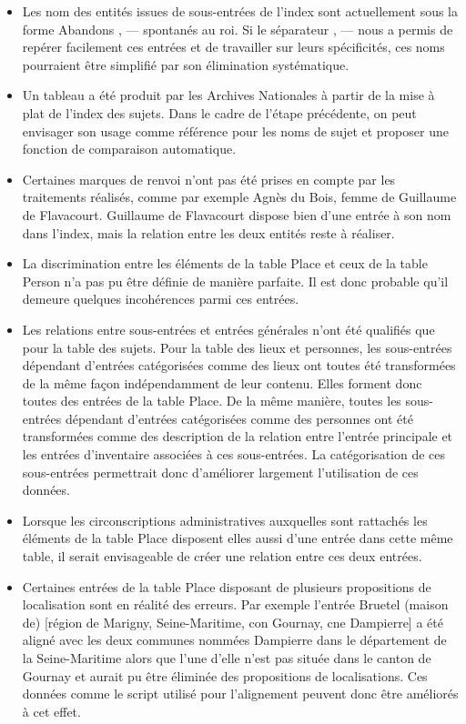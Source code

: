 \documentclass[a4paper,12pt,twoside]{book}
\begin{document}
	\begin{itemize}
		\item Les nom des entités issues de sous-entrées de l'index sont actuellement sous la forme \og Abandons , — spontanés au roi\fg{}. Si le séparateur \og  , — \fg{} nous a permis de repérer facilement ces entrées et de travailler sur leurs spécificités, ces noms pourraient être simplifié par son élimination systématique.
		
		\item Un tableau a été produit par les Archives Nationales à partir de la mise à plat de l'index des sujets. Dans le cadre de l'étape précédente, on peut envisager son usage comme référence pour les noms de sujet et proposer une fonction de comparaison automatique.
		
		\item Certaines marques de renvoi n'ont pas été prises en compte par les traitements réalisés, comme par exemple \og Agnès du Bois, femme de Guillaume de Flavacourt\fg{}. Guillaume de Flavacourt dispose bien d'une entrée à son nom dans l'index, mais la relation entre les deux entités reste à réaliser.
		
		\item La discrimination entre les éléments de la table Place et ceux de la table Person n'a pas pu être définie de manière parfaite. Il est donc probable qu'il demeure quelques incohérences parmi ces entrées.
		
		\item Les relations entre sous-entrées et entrées générales n'ont été qualifiés que pour la table des sujets. Pour la table des lieux et personnes, les sous-entrées dépendant d'entrées catégorisées comme des lieux ont toutes été transformées de la même façon indépendamment de leur contenu. Elles forment donc toutes des entrées de la table Place. De la même manière, toutes les sous-entrées dépendant d'entrées catégorisées comme des personnes ont été transformées comme des description de la relation entre l'entrée principale et les entrées d'inventaire associées à ces sous-entrées. La catégorisation de ces sous-entrées permettrait donc d'améliorer largement l'utilisation de ces données.
		
		\item Lorsque les circonscriptions administratives auxquelles sont rattachés les éléments de la table Place disposent elles aussi d'une entrée dans cette même table, il serait envisageable de créer une relation entre ces deux entrées.
		
		\item Certaines entrées de la table Place disposant de plusieurs propositions de localisation sont en réalité des erreurs. Par exemple l'entrée \og Bruetel (maison de) [région de Marigny, Seine-Maritime, con Gournay, cne Dampierre]\fg{} a été aligné avec les deux communes nommées Dampierre dans le département de la Seine-Maritime alors que l'une d'elle n'est pas située dans le canton de Gournay et aurait pu être éliminée des propositions de localisations. Ces données comme le script utilisé pour l'alignement peuvent donc être améliorés à cet effet.
		

\end{itemize}
\end{document}
